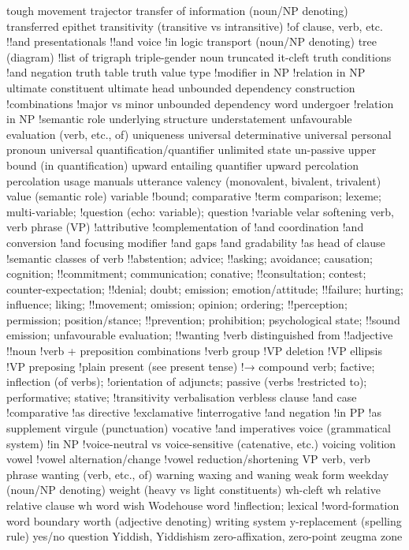 tough movement
trajector
transfer of information (noun/NP denoting)
transferred epithet
transitivity (transitive vs intransitive)
!of clause, verb, etc.
!!and presentationals
!!and voice
!in logic
transport (noun/NP denoting)
tree (diagram)
!list of
trigraph
triple-gender noun
truncated it-cleft
truth conditions
!and negation
truth table
truth value
type
!modifier in NP
!relation in NP
ultimate constituent
ultimate head
unbounded dependency construction
!combinations
!major vs minor
unbounded dependency word
undergoer
!relation in NP
!semantic role
underlying structure
understatement
unfavourable evaluation (verb, etc., of)
uniqueness
universal determinative
universal personal pronoun
universal quantification/quantifier
unlimited state
un-passive
upper bound (in quantification)
upward entailing quantifier
upward percolation percolation
usage manuals
utterance
valency (monovalent, bivalent, trivalent)
value (semantic role)
variable
!bound; comparative
!term comparison; lexeme; multi-variable;
!question (echo: variable); question
!variable
velar softening
verb, verb phrase (VP)
!attributive
!complementation of
!and coordination
!and conversion
!and focusing modifier
!and gaps
!and gradability
!as head of clause
!semantic classes of verb
!!abstention; advice;
!!asking; avoidance; causation; cognition;
!!commitment; communication; conative;
!!consultation; contest; counter-expectation;
!!denial; doubt; emission; emotion/attitude;
!!failure; hurting; influence; liking;
!!movement; omission; opinion; ordering;
!!perception; permission; position/stance;
!!prevention; prohibition; psychological state;
!!sound emission; unfavourable evaluation;
!!wanting
!verb distinguished from
!!adjective
!!noun
!verb + preposition combinations
!verb group
!VP deletion
!VP ellipsis
!VP preposing
!plain present (see present tense)
!→ compound verb; factive; inflection (of verbs);
!orientation of adjuncts; passive (verbs
!restricted to); performative; stative;
!transitivity
verbalisation
verbless clause
!and case
!comparative
!as directive
!exclamative
!interrogative
!and negation
!in PP
!as supplement
virgule (punctuation)
vocative
!and imperatives
voice (grammatical system)
!in NP
!voice-neutral vs voice-sensitive (catenative, etc.)
voicing
volition
vowel
!vowel alternation/change
!vowel reduction/shortening
VP verb, verb phrase
wanting (verb, etc., of)
warning
waxing and waning
weak form
weekday (noun/NP denoting)
weight (heavy vs light constituents)
wh-cleft
wh relative relative clause
wh word
wish
Wodehouse
word
!inflection; lexical
!word-formation
word boundary
worth (adjective denoting)
writing system
y-replacement (spelling rule)
yes/no question
Yiddish, Yiddishism
zero-affixation,
zero-point
zeugma
zone

